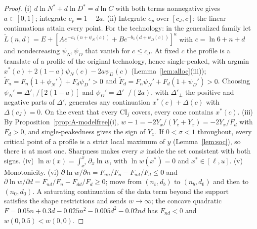 \begin{proof}
(i) $d\ln N^*+d\ln D^*=d\ln C$ with both terms nonnegative gives $a\in[0,1]$; integrate $e_p=1-2a$. (ii) Integrate $e_p$
over $[c_J,c]$; the linear continuations attain every point. For the technology: in the generalized family let
$\tilde L(n,d)=E+[Ae^{-a_1(n+\psi_N(c))}+Be^{-b_1(d+\psi_D(c))}]^\kappa$ with $c=\ln6+n+d$ and nondecreasing
$\psi_N,\psi_D$ that vanish for $c\le c_J$. At fixed $c$ the profile is a translate of a profile of the original
technology, hence single-peaked, with argmin $x^*(c)+2(1-a)\psi_N(c)-2a\psi_D(c)$ (Lemma~\ref{lem:alloc}(iii));
$\tilde F_n=F_n(1+\psi_N')+F_d\psi_D'>0$ and $\tilde F_d=F_n\psi_N'+F_d(1+\psi_D')>0$. Choosing
$\psi_N'=\Delta'_+/[2(1-a)]$ and $\psi_D'=\Delta'_-/(2a)$, with $\Delta'_\pm$ the positive and negative parts of $\Delta'$,
generates any continuation $x^*(c)+\Delta(c)$ with $\Delta(c_J)=0$. On the event that every $\mathrm{CI}_j$ covers, every
cone contains $x^*(c)$. (iii) By Proposition~\ref{prop:A-modelfree}(i), $w-1=-2Y_x/(Y_c+Y_x)=-2Y_x/F_d$ with $F_d>0$, and
single-peakedness gives the sign of $Y_x$. If $0<\sigma<1$ throughout, every critical point of a profile is a strict
local maximum of $y$ (Lemma~\ref{lem:soc}), so there is at most one. Sharpness makes every $x$ inside the set consistent
with both signs. (iv) $\ln w(x)=\int_{x^*}^x\partial_x\ln w$, with $\ln w(x^*)=0$ and $x^*\in[\ell,u]$. (v) Monotonicity.
(vi) $\partial\ln w/\partial n=F_{nn}/F_n-F_{nd}/F_d\le0$ and $\partial\ln w/\partial d=F_{nd}/F_n-F_{dd}/F_d\ge0$; move
from $(n_b,d_b)$ to $(n_b,d_0)$ and then to $(n_0,d_0)$. A saturating continuation of the data term beyond the support
satisfies the shape restrictions and sends $w\to\infty$; the concave quadratic
$F=0.05n+0.3d-0.025n^2-0.005d^2-0.02nd$ has $F_{nd}<0$ and $w(0,0.5)<w(0,0)$.


\end{proof}

